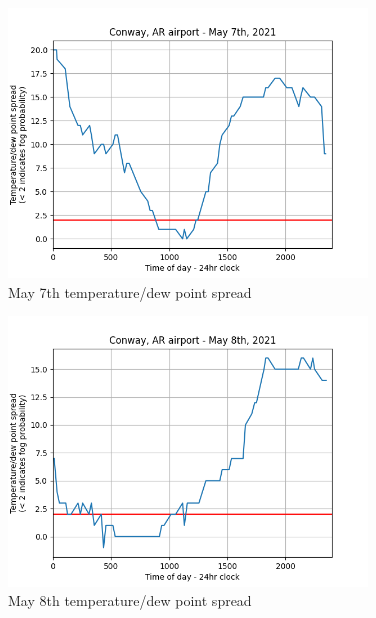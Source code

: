 \documentclass{article}
\begin{document}
\begin{figure}[hbp!]
\begin{center}
\includegraphics[width=0.85\textwidth]{May7th.png}
\end{center}
\caption{May 7th temperature/dew point spread}
\label{May 7th}
\end{figure}

\begin{figure}[htp!]
\begin{center}
\includegraphics[width=0.85\textwidth]{May8th.png}
\end{center}
\caption{May 8th temperature/dew point spread}
\label{May 8th}
\end{figure}
\end{document}
